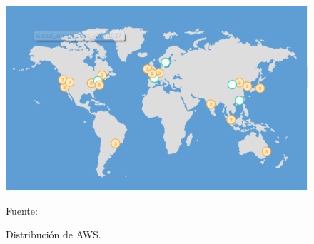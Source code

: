 \documentclass[a4paper, 12pt]{report}
\begin{document}
\begin{justify}
\begin{figure}[ht]
\begin{center}
\includegraphics[scale=0.8]{aws_paises}
\end{center}
\begin{center}
\vskip -0.5cm
\caption{\small{Distribución de AWS.}}
{\small{Fuente: \cite{aws}}}
\end{center}
\end{figure}

\end{justify}
\end{document}
